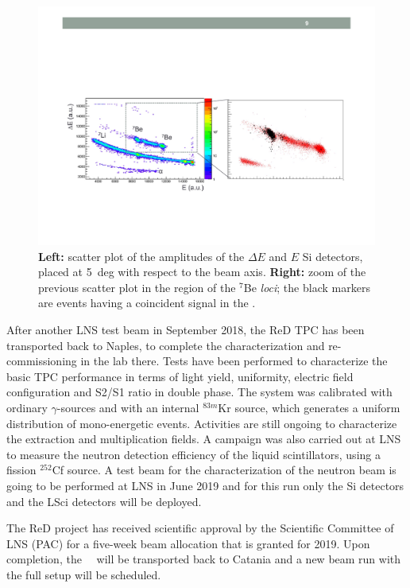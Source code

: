 \begin{figure}[t!]
\centering
\includegraphics[width=\columnwidth]{./Figures/SiData_Li.pdf}
\caption[Preliminary data from the \ReD\ experiment]{{\bf Left:} scatter plot of the amplitudes of the $\Delta E$ and $E$ Si detectors, placed at 5~deg with respect to the beam axis. {\bf Right:} zoom of the previous scatter plot in the region of the $^{7}$Be \emph{loci}; the black markers are events having a coincident signal in the \TPC.}
\label{fig:bananaplot}
\end{figure}

After another LNS test beam in September 2018, the ReD TPC has been transported back to Naples, to complete the characterization and re-commissioning in the lab there. Tests have been performed to characterize the basic TPC performance in terms of light yield, uniformity, electric field configuration and S2/S1 ratio in double phase. The system was calibrated with ordinary $\gamma$-sources and with an internal $^{83m}$Kr source, which generates a uniform distribution of mono-energetic events.  Activities are still ongoing to characterize the extraction and multiplication fields. A campaign was also carried out at LNS to measure the neutron detection efficiency of the liquid scintillators, using a fission $^{252}$Cf source.  A test beam for the characterization of the neutron beam is going to be performed at LNS in June 2019 and for this run only the Si detectors and the LSci detectors will be deployed.  

The ReD project has received scientific approval by the Scientific Committee of LNS (PAC) for a five-week beam allocation that is granted for 2019.  Upon completion, the \ReD\ \LArTPC\ will be transported back to Catania and a new beam run with the full setup will be scheduled.